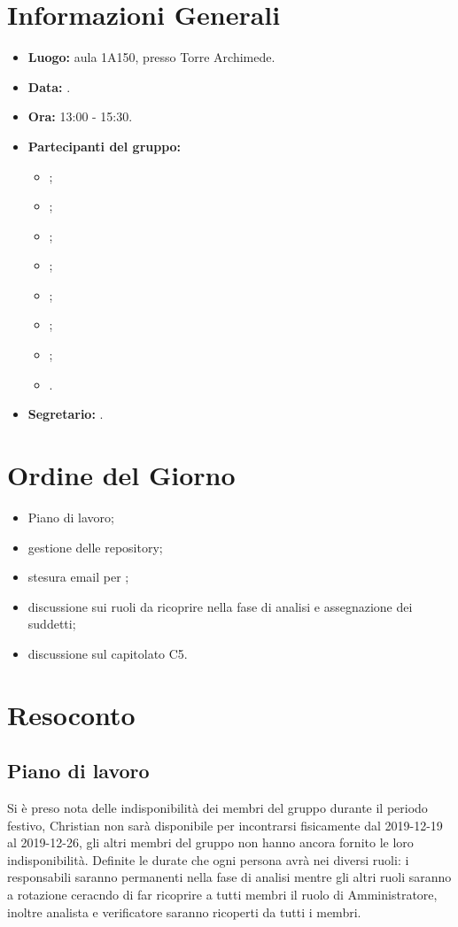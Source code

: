 \section{Informazioni Generali}
\begin{itemize}
\item \textbf{Luogo:} aula 1A150, presso Torre Archimede.
\item \textbf{Data:} \Data.
\item \textbf{Ora:} 13:00 - 15:30.
\item \textbf{Partecipanti del gruppo:}
	\begin{itemize}
		\item \AT{}; 
		\item \BR{};
		\item \CE{}; 
		\item \DF{};
		\item \LD{};
		\item \MC{};
		\item \PF{};
		\item \SE{}.
	\end{itemize} 
\item \textbf{Segretario:} \LD{}.
\end{itemize}


\section{Ordine del Giorno}
\begin{itemize}
\item Piano di lavoro;
\item gestione delle repository;
\item stesura email per \Proponente{};
\item discussione sui ruoli da ricoprire nella fase di analisi e assegnazione dei suddetti;
\item discussione sul capitolato C5.
\end{itemize}



\section{Resoconto}
\subsection{Piano di lavoro}
Si è preso nota delle indisponibilità dei membri del gruppo durante il periodo festivo, Christian non sarà disponibile per incontrarsi fisicamente dal 2019-12-19 al 2019-12-26, gli altri membri del gruppo non hanno ancora fornito le loro indisponibilità. 
Definite le durate che ogni persona avrà nei diversi ruoli: i responsabili saranno permanenti nella fase di analisi mentre gli altri ruoli saranno a rotazione ceracndo di far ricoprire a tutti membri il ruolo di Amministratore, inoltre analista e verificatore saranno ricoperti da tutti i membri.  \\

